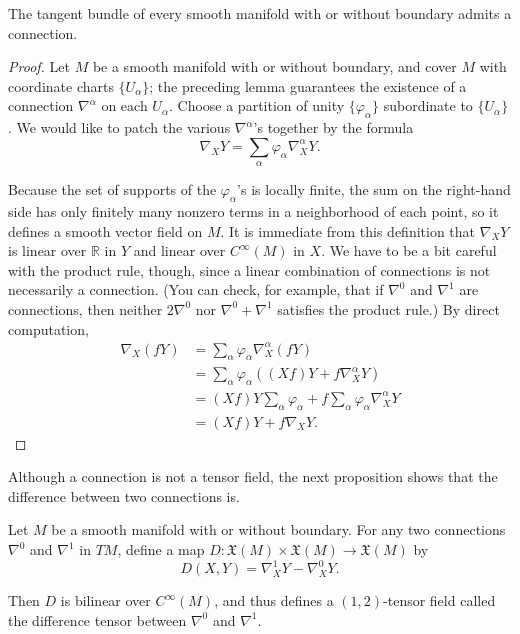 \begin{proposition}
\label{prop:tangent-bundle-admits-connection}
The tangent bundle of every smooth manifold with or without boundary admits a connection.
\end{proposition}

\begin{proof}
Let $M$ be a smooth manifold with or without boundary, and cover $M$ with coordinate charts $\{U_\alpha\}$; the preceding lemma guarantees the existence of a connection $\nabla^\alpha$ on each $U_\alpha$. Choose a partition of unity $\{\varphi_\alpha\}$ subordinate to $\{U_\alpha\}$. We would like to patch the various $\nabla^\alpha$'s together by the formula
\begin{equation}
\nabla_X Y = \sum_\alpha \varphi_\alpha \nabla_X^\alpha Y. \tag{4.11}
\end{equation}

Because the set of supports of the $\varphi_\alpha$'s is locally finite, the sum on the right-hand side has only finitely many nonzero terms in a neighborhood of each point, so it defines a smooth vector field on $M$. It is immediate from this definition that $\nabla_X Y$ is linear over $\mathbb{R}$ in $Y$ and linear over $C^\infty(M)$ in $X$. We have to be a bit careful with the product rule, though, since a linear combination of connections is not necessarily a connection. (You can check, for example, that if $\nabla^0$ and $\nabla^1$ are connections, then neither $2\nabla^0$ nor $\nabla^0 + \nabla^1$ satisfies the product rule.) By direct computation,
\begin{align*}
\nabla_X(fY) &= \sum_\alpha \varphi_\alpha \nabla_X^\alpha(fY) \\
&= \sum_\alpha \varphi_\alpha((Xf)Y + f\nabla_X^\alpha Y) \\
&= (Xf)Y \sum_\alpha \varphi_\alpha + f\sum_\alpha \varphi_\alpha \nabla_X^\alpha Y \\
&= (Xf)Y + f\nabla_X Y.
\end{align*}
\end{proof}

Although a connection is not a tensor field, the next proposition shows that the difference between two connections is.

\begin{proposition}
\label{prop:difference-tensor}
\leanok
Let $M$ be a smooth manifold with or without boundary. For any two connections $\nabla^0$ and $\nabla^1$ in $TM$, define a map $D: \mathfrak{X}(M) \times \mathfrak{X}(M) \to \mathfrak{X}(M)$ by
\[
D(X,Y) = \nabla_X^1 Y - \nabla_X^0 Y.
\]

Then $D$ is bilinear over $C^\infty(M)$, and thus defines a $(1,2)$-tensor field called the difference tensor between $\nabla^0$ and $\nabla^1$.
\end{proposition}


